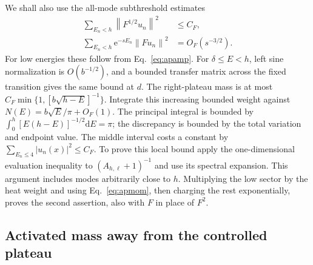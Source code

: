\documentclass[aps,pra,reprint,superscriptaddress,longbibliography]{revtex4-2}
\newcommand{\dd}{\mathrm d}
\newcommand{\ee}{\mathrm e}
\newcommand{\norm}[1]{\left\lVert#1\right\rVert}
\begin{document}
We shall also use the all-mode subthreshold estimates
\begin{equation}
 \begin{aligned}
 \sum_{E_n<h}\norm{F^{1/2}u_n}^2&\le C_F,\qquad\\
 \sum_{E_n<h}\ee^{-sE_n}\norm{Fu_n}^2&=O_F(s^{-3/2}).
 \end{aligned}                                          \label{eq:apcollar}
\end{equation}
For low energies these follow from Eq.~\eqref{eq:apamp}. For
$\delta\le E<h$, left sine normalization is $O(b^{-1/2})$, and a
bounded transfer matrix across the fixed transition gives the same
bound at $d$. The right-plateau mass is at most
$C_F\min\{1,[b\sqrt{h-E}]^{-1}\}$. Integrate this increasing bounded
weight against $N(E)=b\sqrt E/\pi+O_F(1)$. The principal integral is
bounded by $\int_0^h[E(h-E)]^{-1/2}\dd E=\pi$; the discrepancy is
bounded by the total variation and endpoint value. The middle interval
costs a constant by $\sum_{E_n\le4}|u_n(x)|^2\le C_F$. To prove this
local bound apply the one-dimensional evaluation inequality to
$(A_{h,\ell}+1)^{-1}$ and use its spectral expansion. This argument
includes modes arbitrarily close to $h$. Multiplying the low sector
by the heat weight and using Eq.~\eqref{eq:apmom}, then charging the
rest exponentially, proves the second assertion, also with $F$ in
place of $F^2$.

\subsection{Activated mass away from the controlled plateau}
\end{document}
